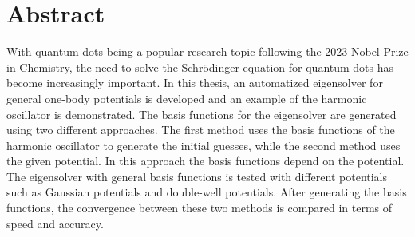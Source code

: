 \chapter*{Abstract}

With quantum dots being a popular research topic following the 2023 Nobel Prize in Chemistry, the need to solve the Schrödinger equation for quantum dots has become increasingly important. 
In this thesis, an automatized eigensolver for general one-body potentials is developed and an example of the harmonic oscillator is demonstrated.
The basis functions for the eigensolver are generated using two different approaches. 
The first method uses the basis functions of the harmonic oscillator to generate the initial guesses, while the second method uses the given potential. In this approach the basis functions depend on the potential.
The eigensolver with general basis functions is tested with different potentials such as Gaussian potentials and double-well potentials.
After generating the basis functions, the convergence between these two methods is compared in terms of speed and accuracy.